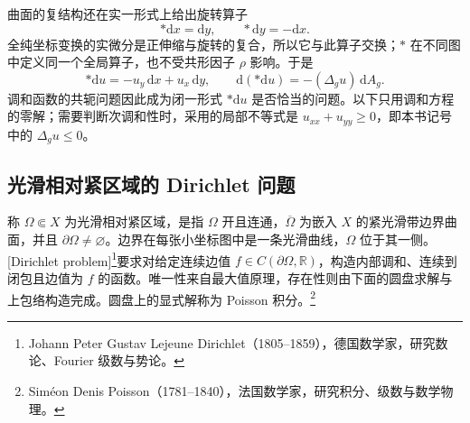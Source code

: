 曲面的复结构还在实一形式上给出旋转算子
\[
	*\mathrm{d}x=\mathrm{d}y,\qquad *\mathrm{d}y=-\mathrm{d}x.
\]
全纯坐标变换的实微分是正伸缩与旋转的复合，所以它与此算子交换；\(*\) 在不同图中定义同一个全局算子，也不受共形因子 \(\rho\) 影响。于是
\begin{equation}
	\label{g4:eq:0501:star-laplacian}
	*\mathrm{d}u=-u_y\,\mathrm{d}x+u_x\,\mathrm{d}y,
	\qquad \mathrm{d}(*\mathrm{d}u)=-(\Delta_g u)\,\mathrm{d}A_g.
\end{equation}
调和函数的共轭问题因此成为闭一形式 \(*\mathrm{d}u\) 是否恰当的问题。以下只用调和方程的零解；需要判断次调和性时，采用的局部不等式是 \(u_{xx}+u_{yy}\ge0\)，即本书记号中的 \(\Delta_g u\le0\)。

\subsection{光滑相对紧区域的 Dirichlet 问题}
\label{g4:subsec:0501:02}

称 \(\Omega\Subset X\) 为光滑相对紧区域，是指 \(\Omega\) 开且连通，\(\overline\Omega\) 为嵌入 \(X\) 的紧光滑带边界曲面，并且 \(\partial\Omega\ne\varnothing\)。边界在每张小坐标图中是一条光滑曲线，\(\Omega\) 位于其一侧。[Dirichlet problem]\footnote{Johann Peter Gustav Lejeune Dirichlet（1805--1859），德国数学家，研究数论、Fourier 级数与势论。}要求对给定连续边值 \(f\in C(\partial\Omega,\mathbb R)\)，构造内部调和、连续到闭包且边值为 \(f\) 的函数。唯一性来自最大值原理，存在性则由下面的圆盘求解与上包络构造完成。圆盘上的显式解称为 Poisson 积分。\footnote{Siméon Denis Poisson（1781--1840），法国数学家，研究积分、级数与数学物理。}

